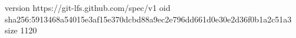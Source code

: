 version https://git-lfs.github.com/spec/v1
oid sha256:5913468a54015e3af15e370dcbd88a9ec2e796dd661d0e30e2d36f0b1a2c51a3
size 1120
